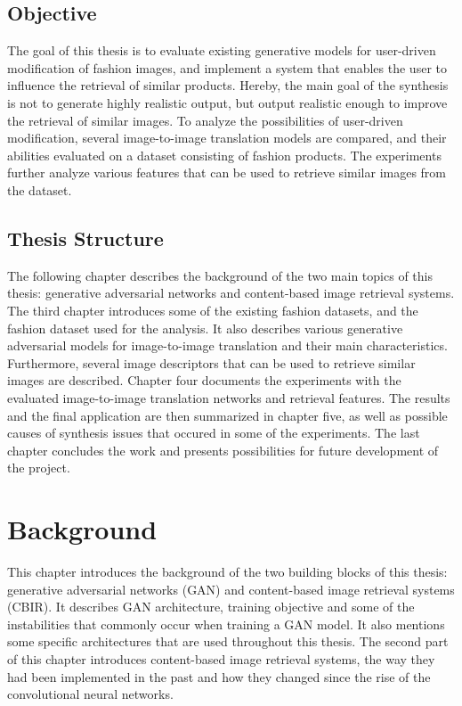 \documentclass[12pt]{report}
\begin{document}

\section{Objective}
The goal of this thesis is to evaluate existing generative models for user-driven modification of fashion images, and implement a system that enables the user to influence the retrieval of similar products. Hereby, the main goal of the synthesis is not to generate highly realistic output, but output realistic enough to improve the retrieval of similar images. To analyze the possibilities of user-driven modification, several image-to-image translation models are compared, and their abilities evaluated on a dataset consisting of fashion products. The experiments further analyze various features that can be used to retrieve similar images from the dataset.


\section{Thesis Structure}
The following chapter describes the background of the two main topics of this thesis: generative adversarial networks and content-based image retrieval systems. The third chapter introduces some of the existing fashion datasets, and the fashion dataset used for the analysis. It also describes various generative adversarial models for image-to-image translation and their main characteristics. Furthermore, several image descriptors that can be used to retrieve similar images are described. Chapter four documents the experiments with the evaluated image-to-image translation networks and retrieval features. The results and the final application are then summarized in chapter five, as well as possible causes of synthesis issues that occured in some of the experiments. The last chapter concludes the work and presents possibilities for future development of the project.

\newpage
\chapter{Background}
This chapter introduces the background of the two building blocks of this thesis: generative adversarial networks (GAN) and content-based image retrieval systems (CBIR). It describes GAN architecture, training objective and some of the instabilities that commonly occur when training a GAN model. It also mentions some specific architectures that are used throughout this thesis. The second part of this chapter introduces content-based image retrieval systems, the way they had been implemented in the past and how they changed since the rise of the convolutional neural networks.
\end{document}
